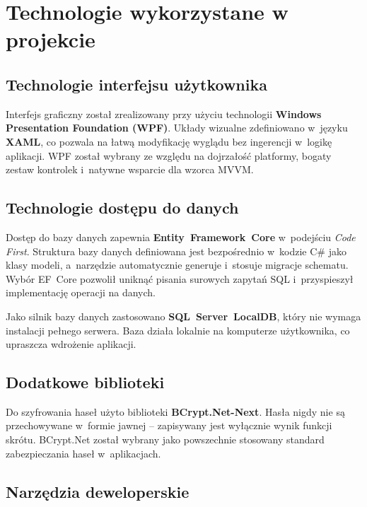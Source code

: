 \chapter{Technologie wykorzystane w projekcie}
\label{ch:technologie}

\section{Technologie interfejsu u\.{z}ytkownika}

Interfejs graficzny zosta\l{} zrealizowany przy u\.{z}yciu technologii
\textbf{Windows Presentation Foundation (WPF)}. Uk\l{}ady wizualne
zdefiniowano w~j\k{e}zyku \textbf{XAML}, co pozwala na \l{}atw\k{a}
modyfikacj\k{e} wygl\k{a}du bez ingerencji w~logik\k{e} aplikacji.
WPF zosta\l{} wybrany ze wzgl\k{e}du na dojrza\l{}o\'{s}\'{c} platformy,
bogaty zestaw kontrolek i~natywne wsparcie dla wzorca MVVM.

\section{Technologie dost\k{e}pu do danych}

Dost\k{e}p do bazy danych zapewnia \textbf{Entity~Framework~Core}
w~podej\'{s}ciu \emph{Code First}. Struktura bazy danych definiowana jest
bezpo\'{s}rednio w~kodzie C\# jako klasy modeli, a~narz\k{e}dzie
automatycznie generuje i~stosuje migracje schematu. Wyb\'{o}r EF~Core
pozwoli\l{} unikn\k{a}\'{c} pisania surowych zapyta\'{n} SQL i~przyspieszy\l{}
implementacj\k{e} operacji na danych.

Jako silnik bazy danych zastosowano \textbf{SQL~Server~LocalDB}, kt\'{o}ry
nie wymaga instalacji pe\l{}nego serwera. Baza dzia\l{}a lokalnie na komputerze
u\.{z}ytkownika, co upraszcza wdro\.{z}enie aplikacji.

\section{Dodatkowe biblioteki}

Do szyfrowania hase\l{} u\.{z}yto biblioteki \textbf{BCrypt.Net-Next}.
Has\l{}a nigdy nie s\k{a} przechowywane w~formie jawnej -- zapisywany jest
wy\l{}\k{a}cznie wynik funkcji skr\'{o}tu. BCrypt.Net zosta\l{} wybrany
jako powszechnie stosowany standard zabezpieczania hase\l{} w~aplikacjach.

\section{Narz\k{e}dzia deweloperskie}

